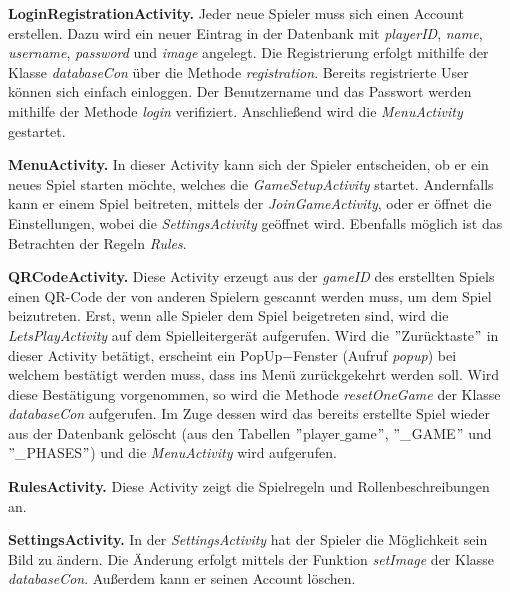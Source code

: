\documentclass[12pt, a4paper]{article}
\begin{document}
\vspace{0,3 cm}      
     
\textbf{LoginRegistrationActivity.}
Jeder neue Spieler muss sich einen Account erstellen. Dazu wird ein neuer Eintrag in der Datenbank mit \textit{playerID}, \textit{name}, \textit{username}, \textit{password} und \textit{image} angelegt. Die Registrierung erfolgt mithilfe der Klasse \textit{databaseCon} über die Methode \textit{registration}. Bereits registrierte User können sich einfach einloggen. Der Benutzername und das Passwort werden mithilfe der Methode \textit{login} verifiziert.
Anschließend wird die \textit{MenuActivity} gestartet.

\vspace{0,3 cm} 
     
\textbf{MenuActivity.}
In dieser Activity kann sich der Spieler entscheiden, ob er ein neues Spiel starten möchte, welches
die \textit{GameSetupActivity} startet.
Andernfalls kann er einem Spiel beitreten, mittels der \textit{JoinGameActivity}, oder er öffnet die Einstellungen, wobei die \textit{SettingsActivity} geöffnet wird.
Ebenfalls möglich ist das Betrachten der Regeln \textit{Rules}.

\vspace{0,3 cm}
      
\textbf{QRCodeActivity.}
Diese Activity erzeugt aus der \textit{gameID} des erstellten Spiels einen QR-Code der von anderen Spielern
gescannt werden muss, um dem Spiel beizutreten. Erst, wenn alle Spieler dem Spiel beigetreten sind,  wird die \textit{LetsPlayActivity} auf dem Spielleitergerät aufgerufen. 
Wird die $"$Zurücktaste$"$ in dieser Activity betätigt, erscheint ein PopUp$-$Fenster (Aufruf \textit{popup}) bei 
welchem bestätigt werden muss, dass ins Menü zurückgekehrt werden soll. Wird diese Bestätigung vorgenommen, 
so wird die Methode \textit{resetOneGame} der Klasse \textit{databaseCon} aufgerufen. Im Zuge dessen wird das bereits erstellte
Spiel wieder aus der Datenbank gelöscht (aus den Tabellen $"$player$\_$game$"$, $"\_$GAME$"$ und $"\_$PHASES$"$) und die \textit{MenuActivity} wird aufgerufen.

\vspace{0,3 cm}
      
\textbf{RulesActivity.}
Diese Activity zeigt die Spielregeln und Rollenbeschreibungen an.

\vspace{0,3 cm}
      
\textbf{SettingsActivity.}
In der \textit{SettingsActivity} hat der Spieler die Möglichkeit sein Bild zu ändern. Die Änderung erfolgt mittels der Funktion \textit{setImage} der Klasse \textit{databaseCon}. Außerdem kann er seinen Account löschen.
  
\end{document}
